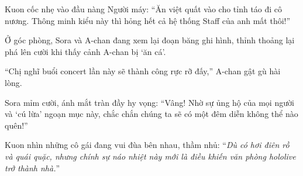 \documentclass[../main.tex]{subfiles}
\begin{document}
Kuon cốc nhẹ vào đầu nàng Người máy: ``Ăn việt quất vào cho tỉnh táo đi cô nương. Thông minh kiểu này thì hỏng hết cả hệ thống Staff của anh mất thôi!''

Ở góc phòng, Sora và A-chan đang xem lại đoạn băng ghi hình, thỉnh thoảng lại phá lên cười khi thấy cảnh A-chan bị `ăn cá'.

``Chị nghĩ buổi concert lần này sẽ thành công rực rỡ đấy,'' A-chan gật gù hài lòng.

Sora mỉm cười, ánh mắt tràn đầy hy vọng: ``Vâng! Nhờ sự ủng hộ của mọi người và `cú lừa' ngoạn mục này, chắc chắn chúng ta sẽ có một đêm diễn không thể nào quên!''

Kuon nhìn những cô gái đang vui đùa bên nhau, thầm nhủ: ``\textit{Dù có hơi điên rồ và quái quặc, nhưng chính sự náo nhiệt này mới là điều khiến văn phòng hololive trở thành nhà.}''
\end{document}
